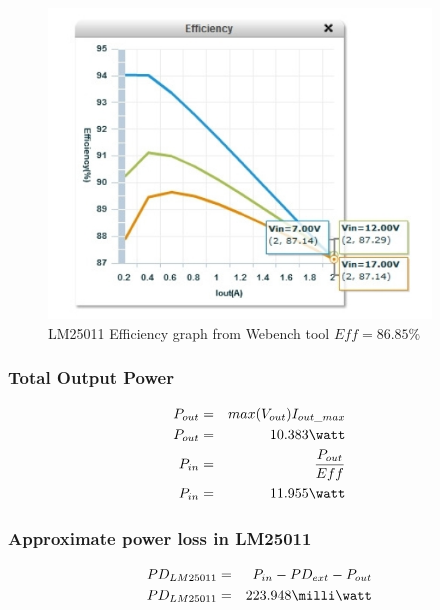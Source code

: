 \begin{figure}[htbp]
\begin{center}
\includegraphics[width=4in]{includes/eff}
\caption{LM25011 Efficiency graph from Webench tool $Eff=86.85\percent$}
\label{fig:1}
\end{center}
\end{figure}


\subsubsection{Total Output Power}
\begin{eqnarray}
P_{out}&=&max(V_{out})I_{out\_max}\\
P_{out}&=&10.383\watt\\
P_{in}&=&\frac{P_{out}}{Eff}\\
P_{in}&=&11.955\watt
\end{eqnarray}

\subsubsection{Approximate power loss in LM25011}
\begin{eqnarray}
PD_{LM25011}&=&P_{in}-PD_{ext}-P_{out}\\
PD_{LM25011}&=&223.948\milli\watt
\end{eqnarray}

